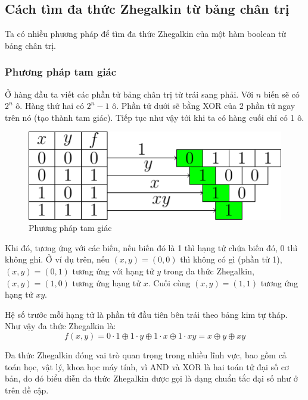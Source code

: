 \subsection*{Cách tìm đa thức Zhegalkin từ bảng chân trị}

Ta có nhiều phương pháp để tìm đa thức Zhegalkin của một hàm 
boolean từ bảng chân trị. 

\subsubsection*{Phương pháp tam giác}

Ở hàng đầu ta viết các phần
tử bảng chân trị từ trái sang phải. Với $n$ biến sẽ có $2^n$ ô.
Hàng thứ hai có $2^n-1$ ô. Phần tử dưới sẽ bằng XOR của 2 phần tử 
ngay trên nó (tạo thành tam giác). Tiếp tục như vậy tới khi
ta có hàng cuối chỉ có 1 ô.

\begin{figure}[ht]
    \centering
    \includegraphics[page=1]{figures/boolean/zhegalkin.pdf}
    \caption{Phương pháp tam giác}
\end{figure}

Khi đó, tương ứng với các biến, nếu biến đó là 1 thì hạng tử chứa
biến đó, 0 thì không ghi. Ở ví dụ trên, nếu $(x, y) = (0, 0)$ 
thì không có gì (phần tử 1), $(x, y) = (0, 1)$ tương ứng với hạng 
tử $y$ trong đa thức Zhegalkin, $(x, y) = (1, 0)$ tương ứng hạng
tử $x$. Cuối cùng $(x, y) = (1, 1)$ tương ứng hạng tử $xy$.

Hệ số trước mỗi hạng tử là phần tử đầu tiên bên trái theo bảng
kim tự tháp. Như vậy đa thức Zhegalkin là:
\begin{equation*}
    f(x, y) = 0 \cdot 1 \oplus 1 \cdot y \oplus 1 \cdot x \oplus 
        1 \cdot xy = x \oplus y \oplus xy
\end{equation*}

Đa thức Zhegalkin đóng vai trò quan trọng trong nhiều lĩnh vực,
bao gồm cả toán học, vật lý, khoa học máy tính, vì AND và XOR
là hai toán tử đại số cơ bản, do đó biểu diễn đa thức Zhegalkin
được gọi là dạng chuẩn tắc đại số như ở trên đề cập.

